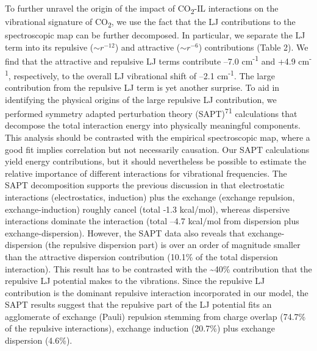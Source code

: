 \documentclass[]{article}
\begin{document}
To further unravel the origin of the impact of CO\textsubscript{2}-IL interactions on the vibrational signature of CO\textsubscript{2}, we use the fact that the LJ contributions to the spectroscopic map can be further decomposed. In particular, we separate the LJ term into its repulsive (\({\sim r}^{- 12}\)) and attractive (\(\sim r^{- 6}\)) contributions (Table 2). We find that the attractive and repulsive LJ terms contribute --7.0 cm\textsuperscript{-1} and +4.9 cm\textsuperscript{-1}, respectively, to the overall LJ vibrational shift of --2.1 cm\textsuperscript{-1}. The large contribution from the repulsive LJ term is yet another surprise. To aid in identifying the physical origins of the large repulsive LJ contribution, we performed symmetry adapted perturbation theory (SAPT)\textsuperscript{71} calculations that decompose the total interaction energy into physically meaningful components. This analysis should be contrasted with the empirical spectroscopic map, where a good fit implies correlation but not necessarily causation. Our SAPT calculations yield energy contributions, but it should nevertheless be possible to estimate the relative importance of different interactions for vibrational frequencies. The SAPT decomposition supports the previous discussion in that electrostatic interactions (electrostatics, induction) plus the exchange (exchange repulsion, exchange-induction) roughly cancel (total ‑1.3 kcal/mol), whereas dispersive interactions dominate the interaction (total ­--4.7 kcal/mol from dispersion plus exchange-dispersion).  However, the SAPT data also reveals that exchange-dispersion (the repulsive dispersion part) is over an order of magnitude smaller than the attractive dispersion contribution (10.1\% of the total dispersion interaction). This result has to be contrasted with the \textasciitilde{}40\% contribution that the repulsive LJ potential makes to the vibrations. Since the repulsive LJ contribution is the dominant repulsive interaction incorporated in our model, the SAPT results suggest that the repulsive part of the LJ potential fits an agglomerate of exchange (Pauli) repulsion stemming from charge overlap (74.7\% of the repulsive interactions), exchange induction (20.7\%) plus exchange dispersion (4.6\%).
\end{document}
